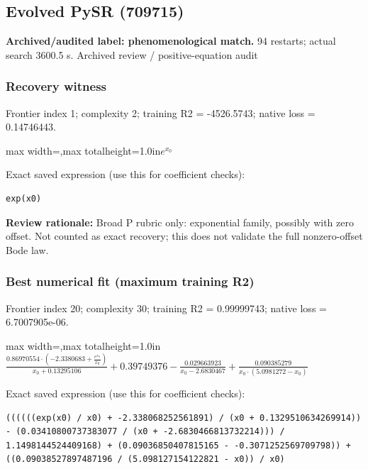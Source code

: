 \documentclass[10pt,letterpaper,landscape]{article}
\begin{document}
\begin{minipage}[t]{0.485\textwidth}
\subsection*{Evolved PySR (709715)}
\textbf{Archived/audited label: phenomenological match.} 94 restarts; actual search 3600.5 s.
{\small Archived review / positive-equation audit}
\subsubsection*{Recovery witness}
Frontier index 1; complexity 2; training R2 = -4526.5743; native loss = 0.14746443.
\begin{center}\begin{adjustbox}{max width=\linewidth,max totalheight=1.0in}$\displaystyle e^{x_{0}}$\end{adjustbox}\end{center}
{\scriptsize Exact saved expression (use this for coefficient checks):}
\begin{lstlisting}
exp(x0)
\end{lstlisting}
{\small\textbf{Review rationale:} Broad P rubric only: exponential family, possibly with zero offset. Not counted as exact recovery; this does not validate the full nonzero-offset Bode law.}
\subsubsection*{Best numerical fit (maximum training R2)}
Frontier index 20; complexity 30; training R2 = 0.99999743; native loss = 6.7007905e-06.
\begin{center}\begin{adjustbox}{max width=\linewidth,max totalheight=1.0in}$\displaystyle \frac{0.86970554 \cdot \left(-2.3380683 + \frac{e^{x_{0}}}{x_{0}}\right)}{x_{0} + 0.13295106} + 0.39749376 - \frac{0.029663923}{x_{0} - 2.6830467} + \frac{0.090385279}{x_{0} \cdot \left(5.0981272 - x_{0}\right)}$\end{adjustbox}\end{center}
{\scriptsize Exact saved expression (use this for coefficient checks):}
\begin{lstlisting}
((((((exp(x0) / x0) + -2.338068252561891) / (x0 + 0.1329510634269914)) - (0.03410800737383077 / (x0 + -2.6830466813732214))) / 1.1498144524409168) + (0.09036850407815165 - -0.3071252569709798)) + ((0.09038527897487196 / (5.098127154122821 - x0)) / x0)
\end{lstlisting}
\end{minipage}
\clearpage{}\label{bode-10008}
\end{document}

